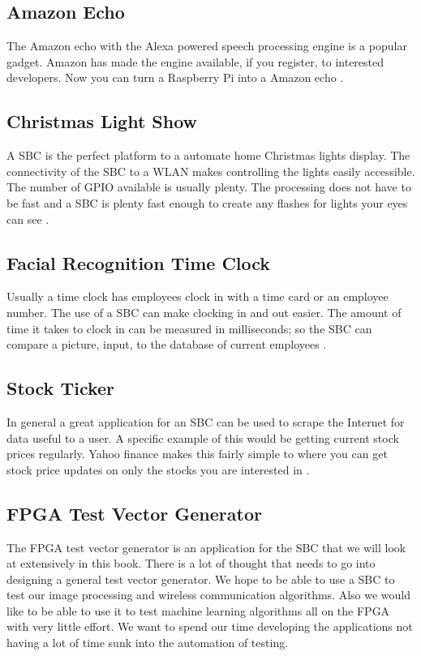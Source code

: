 \subsection{Amazon Echo}
The Amazon echo with the Alexa powered speech processing engine is a popular gadget. Amazon has made the engine available, if you register, to interested developers. Now you can turn a Raspberry Pi into a Amazon echo \cite{amzecho}. 
	
	
\subsection{Christmas Light Show}

A \ac{SBC} is the perfect platform to a automate home Christmas lights display. The connectivity of the \ac{SBC} to a \ac{WLAN} makes controlling the lights easily accessible. The number of \ac{GPIO} available is usually plenty. The processing does not have to be fast and a \ac{SBC} is plenty fast enough to create any flashes for lights your eyes can see \cite{cliteshow}. 
	
	
\subsection{Facial Recognition Time Clock}

Usually a time clock has employees clock in with a time card or an employee number. The use of a \ac{SBC} can make clocking in and out easier. The amount of time it takes to clock in can be measured in milliseconds; so the \ac{SBC} can compare a picture, input, to the database of current employees \cite{facepunch}. 
	
\subsection{Stock Ticker}

In general a great application for an \ac{SBC} can be used to scrape the Internet for data useful to a user. A specific example of this would be getting current stock prices regularly. Yahoo finance makes this fairly simple to where you can get stock price updates on only the stocks you are interested in \cite{stocktick}. 
	
	
\subsection{FPGA Test Vector Generator}

The \ac{FPGA} test vector generator is an application for the \ac{SBC} that we will look at extensively in this book. There is a lot of thought that needs to go into designing a general test vector generator. We hope to be able to use a \ac{SBC} to test our image processing and wireless communication algorithms. Also we would like to be able to use it to test machine learning algorithms all on the \ac{FPGA} with very little effort. We want to spend our time developing the applications not having a lot of time sunk into the automation of testing.

